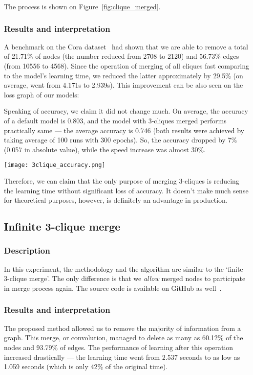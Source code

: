 The process is shown on Figure~\ref{fig:clique_merged}.

\subsubsection*{Results and interpretation}

A benchmark on the Cora dataset~\cite{cora_dataset} had shown that we are able to remove a total of 21.71\% of nodes (the number reduced from 2708 to 2120) and 56.73\% edges (from 10556 to 4568).
Since the operation of merging of all cliques fast comparing to the model's learning time, we reduced the latter approximately by 29.5\% (on average, went from 4.171s to 2.939s).
This improvement can be also seen on the loss graph of our models:

Speaking of accuracy, we claim it did not change much.
On average, the accuracy of a default model is 0.803, and the model with 3-cliques merged performs practically same --- the average accuracy is 0.746 (both results were achieved by taking average of 100 runs with 300 epochs).
So, the accuracy dropped by 7\% (0.057 in absolute value), while the speed increase was almost 30\%.

\begin{center}
	\texttt{[image: 3clique\_accuracy.png]}
\end{center}

Therefore, we can claim that the only purpose of merging 3-cliques is reducing the learning time without significant loss of accuracy.
It doesn't make much sense for theoretical purposes, however, is definitely an advantage in production.

\subsection{Infinite 3-clique merge}
\subsubsection*{Description}
In this experiment, the methodology and the algorithm are similar to the `finite 3-clique merge'.
The only difference is that we \emph{allow} merged nodes to participate in merge process again.
The source code is available on GitHub as well~\cite{3clique_inf_merge_experiment}.

\subsubsection*{Results and interpretation}
The proposed method allowed us to remove the majority of information from a graph.
This merge, or convolution, managed to delete as many as 60.12\% of the nodes and 93.79\% of edges.
The performance of learning after this operation increased drastically --- the learning time went from 2.537 seconds to as low as 1.059 seconds (which is only 42\% of the original time).

